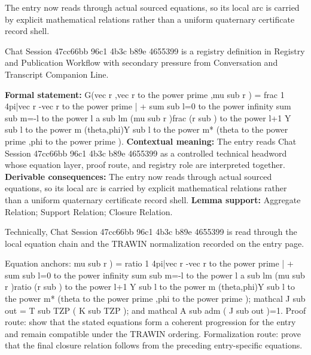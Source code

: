 The entry now reads through actual sourced equations, so its local arc is carried by explicit mathematical relations rather than a uniform quaternary certificate record shell.
\clearpage


\begingroup\small
{}
Chat Session 47cc66bb 96c1 4b3c b89e 4655399 is a registry definition in Registry and Publication Workflow with secondary pressure from Conversation and Transcript Companion Line.

\begingroup\footnotesize\setlength{\emergencystretch}{3em}\sloppy
\textbf{Formal statement:} G(vec r ,vec r to the power prime ,mu sub r ) = frac 1 4pi|vec r -vec r to the power prime | + sum sub l=0 to the power infinity sum sub m=-l to the power l a sub lm (mu sub r )frac (r sub ) to the power l+1 Y sub l to the power m (theta,phi)Y sub l to the power m* (theta to the power prime ,phi to the power prime ). \textbf{Contextual meaning:} The entry reads Chat Session 47cc66bb 96c1 4b3c b89e 4655399 as a controlled technical headword whose equation layer, proof route, and registry role are interpreted together. \textbf{Derivable consequences:} The entry now reads through actual sourced equations, so its local arc is carried by explicit mathematical relations rather than a uniform quaternary certificate record shell. \textbf{Lemma support:} Aggregate Relation; Support Relation; Closure Relation.\par
\endgroup

Technically, Chat Session 47cc66bb 96c1 4b3c b89e 4655399 is read through the local equation chain and the TRAWIN normalization recorded on the entry page.

Equation anchors: mu sub r ) = ratio 1 4pi|vec r -vec r to the power prime | + sum sub l=0 to the power infinity sum sub m=-l to the power l a sub lm (mu sub r )ratio (r sub ) to the power l+1 Y sub l to the power m (theta,phi)Y sub l to the power m* (theta to the power prime ,phi to the power prime ); mathcal J sub out = T sub TZP ( K sub TZP ); and mathcal A sub adm ( J sub out )=1. Proof route: show that the stated equations form a coherent progression for the entry and remain compatible under the TRAWIN ordering. Formalization route: prove that the final closure relation follows from the preceding entry-specific equations.

